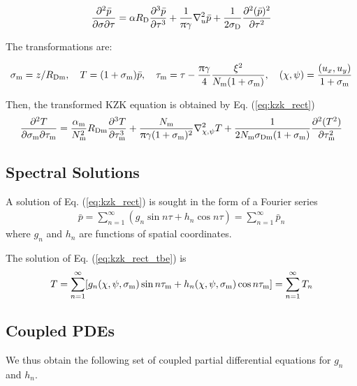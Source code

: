 \documentclass{article}
\begin{document}
\begin{align}
	\pdv{\bar{p} }{\sigma}{\tau}= \alpha R\st{D} \pdv[3]{\bar{p} }{\tau} +
	\frac{1}{\uppi \gamma} \laplacian_u \bar{p} + \frac{1}{2\sigma\st{D}} \pdv[2]{ (\bar{p})^2}{\tau}
	\label{eq:kzk_rect}
\end{align}

The transformations are:

\begin{align}
	\sigma\st{m} = z/R\st{Dm}\qc
	T = (1+\sigma\st{m})\bar{p}\qc
	\tau\st{m} = \tau - \frac{\uppi \gamma}{4} \frac{\xi^2}{N\st{m} (1+\sigma\st{m})}\qc
	(\chi, \psi) = \frac{(u_x,u_y)}{1+\sigma\st{m}}
\end{align}

Then, the transformed KZK equation is obtained by Eq. (\ref{eq:kzk_rect}) 
\begin{align}
	\pdv{T}{\sigma\st{m}}{\tau\st{m}} 
	= 
	\frac{\alpha\st{m}}{N\st{m}^2} R\st{Dm} \pdv[3]{T}{\tau\st{m}}
	+ \frac{N\st{m}}{\uppi \gamma(1+\sigma\st{m})^2} \laplacian_{\chi, \psi} T
	+\frac{1}{2N\st{m}\sigma\st{Dm}(1+\sigma\st{m})}
	\pdv[2]{(T^2)}{\tau\st{m}}
	\label{eq:kzk_rect_tbe}
\end{align}

\subsection{Spectral Solutions}

A solution of Eq. (\ref{eq:kzk_rect}) is sought in the form of a Fourier series
\begin{align}
	\label{eq:fourier}
	\bar{p} = \sum_{n=1}^\infty (g_n \sin n\tau + h_n \cos n\tau ) = \sum_{n=1}^\infty \bar{p}_n
\end{align}
where $g_n$ and $h_n$ are functions of spatial coordinates.

The solution of Eq. (\ref{eq:kzk_rect_tbe}) is 
\begin{align}
	T = \sum_{n=1}^\infty [g_n(\chi,\psi,\sigma_\text{m}) \sin n\tau_\text{m} 
		+ h_n(\chi,\psi,\sigma_\text{m}) \cos n\tau_\text{m} ] 
	= \sum_{n=1}^\infty T_n
\end{align}

\subsection{Coupled PDEs}
We thus obtain the following set of coupled partial differential equations for $g_n$ and $h_n$.
\end{document}
